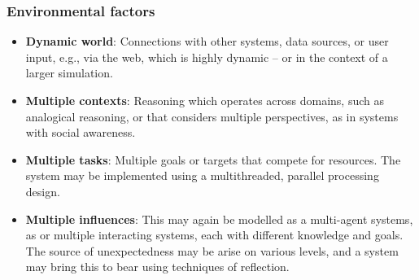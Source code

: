 \subsubsection*{Environmental factors}

\begin{itemize}
\item \textbf{Dynamic world}: Connections with other systems, data
  sources, or user input, e.g., via the web, which is highly dynamic --
  or in the context of a larger simulation.
\item \textbf{Multiple contexts}: Reasoning which operates across
  domains, such as analogical reasoning, or that considers multiple
  perspectives, as in systems with social awareness.
\item \textbf{Multiple tasks}: Multiple goals or targets that compete
  for resources.  The system may be implemented using a multithreaded,
  parallel processing design.
\item \textbf{Multiple influences}: This may again be modelled as a
  multi-agent systems, as or multiple interacting systems, each with
  different knowledge and goals.  The source of unexpectedness may be
  arise on various levels, and a system may bring this to bear using
  techniques of reflection.
\end{itemize}
